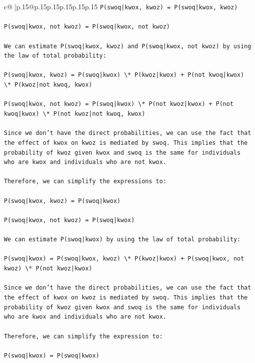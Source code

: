 \documentclass{article}
\begin{document}
{\begin{supertabular}{c@{$\;$}|p{.15\linewidth}@{}p{.15\linewidth}p{.15\linewidth}p{.15\linewidth}p{.15\linewidth}p{.15\linewidth}}
{{{\texttt{P(swoq|kwox, kwoz) = P(swoq|kwox, kwoz)} \\
\\ 
\texttt{P(swoq|kwox, not kwoz) = P(swoq|kwox, not kwoz)} \\
\\ 
\texttt{We can estimate P(swoq|kwox, kwoz) and P(swoq|kwox, not kwoz) by using the law of total probability:} \\
\\ 
\texttt{P(swoq|kwox, kwoz) = P(swoq|kwox) \textbackslash{}* P(kwoz|kwox) + P(not kwoq|kwox) \textbackslash{}* P(kwoz|not kwoq, kwox)} \\
\\ 
\texttt{P(swoq|kwox, not kwoz) = P(swoq|kwox) \textbackslash{}* P(not kwoz|kwox) + P(not kwoq|kwox) \textbackslash{}* P(not kwoz|not kwoq, kwox)} \\
\\ 
\texttt{Since we don't have the direct probabilities, we can use the fact that the effect of kwox on kwoz is mediated by swoq. This implies that the probability of kwoz given kwox and swoq is the same for individuals who are kwox and individuals who are not kwox.} \\
\\ 
\texttt{Therefore, we can simplify the expressions to:} \\
\\ 
\texttt{P(swoq|kwox, kwoz) = P(swoq|kwox)} \\
\\ 
\texttt{P(swoq|kwox, not kwoz) = P(swoq|kwox)} \\
\\ 
\texttt{We can estimate P(swoq|kwox) by using the law of total probability:} \\
\\ 
\texttt{P(swoq|kwox) = P(swoq|kwox, kwoz) \textbackslash{}* P(kwoz|kwox) + P(swoq|kwox, not kwoz) \textbackslash{}* P(not kwoz|kwox)} \\
\\ 
\texttt{Since we don't have the direct probabilities, we can use the fact that the effect of kwox on kwoz is mediated by swoq. This implies that the probability of kwoz given kwox and swoq is the same for individuals who are kwox and individuals who are not kwox.} \\
\\ 
\texttt{Therefore, we can simplify the expression to:} \\
\\ 
\texttt{P(swoq|kwox) = P(swoq|kwox)} \\
}}}
\end{supertabular}}
\end{document}
